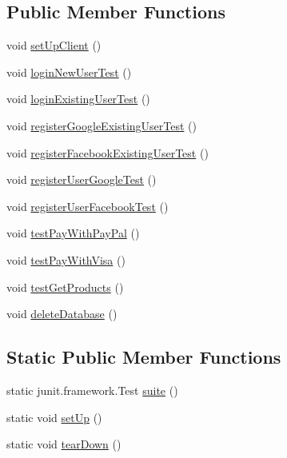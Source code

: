\subsection*{Public Member Functions}
\begin{DoxyCompactItemize}
\item 
void \mbox{\hyperlink{class_s_p_q_1_1_r_m_i_test_a7ec13d55d5cb3716468c3e9d7b5740d3}{set\+Up\+Client}} ()
\item 
void \mbox{\hyperlink{class_s_p_q_1_1_r_m_i_test_a07409afe054b3fd3ee0481236e45b680}{login\+New\+User\+Test}} ()
\item 
void \mbox{\hyperlink{class_s_p_q_1_1_r_m_i_test_a0e9430910652b8ebeb99d2e871476ff1}{login\+Existing\+User\+Test}} ()
\item 
void \mbox{\hyperlink{class_s_p_q_1_1_r_m_i_test_ad375aaea37b3b8f68c670f4c09834a7b}{register\+Google\+Existing\+User\+Test}} ()
\item 
void \mbox{\hyperlink{class_s_p_q_1_1_r_m_i_test_aebfcce491b9fa13cafa971bac73f88b8}{register\+Facebook\+Existing\+User\+Test}} ()
\item 
void \mbox{\hyperlink{class_s_p_q_1_1_r_m_i_test_a18c26a1a1882c74b0ff9a0142c9492c8}{register\+User\+Google\+Test}} ()
\item 
void \mbox{\hyperlink{class_s_p_q_1_1_r_m_i_test_aaba807356f43d06d07e10da5ce5a53c6}{register\+User\+Facebook\+Test}} ()
\item 
void \mbox{\hyperlink{class_s_p_q_1_1_r_m_i_test_a15a72e3572c99f10ba0ac5b0368f1a02}{test\+Pay\+With\+Pay\+Pal}} ()
\item 
void \mbox{\hyperlink{class_s_p_q_1_1_r_m_i_test_afc93d812f0763a7bd63583e6a573f024}{test\+Pay\+With\+Visa}} ()
\item 
void \mbox{\hyperlink{class_s_p_q_1_1_r_m_i_test_afd1616ccf97ef054e05f3ca90d22753e}{test\+Get\+Products}} ()
\item 
void \mbox{\hyperlink{class_s_p_q_1_1_r_m_i_test_a38f0b0aa6d0cf1cf8f5bf3960b75954e}{delete\+Database}} ()
\end{DoxyCompactItemize}
\subsection*{Static Public Member Functions}
\begin{DoxyCompactItemize}
\item 
static junit.\+framework.\+Test \mbox{\hyperlink{class_s_p_q_1_1_r_m_i_test_a7cc9358271c503f37c8092d93a6ce95c}{suite}} ()
\item 
static void \mbox{\hyperlink{class_s_p_q_1_1_r_m_i_test_ab314266e24b54a7e2f482a3a0b48edaf}{set\+Up}} ()
\item 
static void \mbox{\hyperlink{class_s_p_q_1_1_r_m_i_test_a76a8f88205d4a70c8ed81ee03ab7fa45}{tear\+Down}} ()
\end{DoxyCompactItemize}


